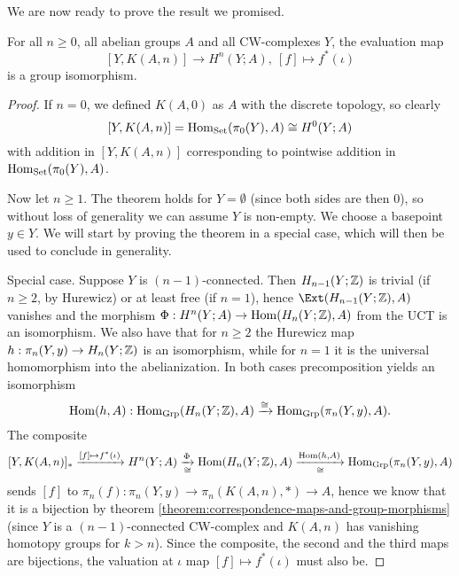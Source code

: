 We are now ready to prove the result we promised.

\begin{theorem}
For all $n\ge0$, all abelian groups $A$ and all CW-complexes $Y$, the evaluation map
\[
    [Y,K(A,n)]\to H^n(Y;A),\ [f]\mapsto f^*(\iota)
\]
is a group isomorphism.
\end{theorem}

\begin{proof}\renewcommand{\qedsymbol}{\textit{To be continued...}}
If $n=0$, we defined $K(A,0)$ as $A$ with the discrete topology, so clearly
\[[Y,K(A,n)]=\operatorname{Hom}_{\mathrm{Set}}(\pi_0(Y),A)\cong H^0(Y;A)\]
with addition in $[Y,K(A,n)]$ corresponding to pointwise addition in $\operatorname{Hom}_{\mathrm{Set}}(\pi_0(Y),A)$.

Now let $n\ge1$. The theorem holds for $Y=\emptyset$ (since both sides are then $0$), so without loss of generality we can assume $Y$ is non-empty. We choose a basepoint $y\in Y$. We will start by proving the theorem in a special case, which will then be used to conclude in generality.

Special case. Suppose $Y$ is $(n-1)$-connected. Then $H_{n-1}(Y;{\mathbb Z})$ is trivial (if $n\ge2$, by Hurewicz) or at least free (if $n=1$), hence $\Ext(H_\ni(Y;\Z),A)$ vanishes and the morphism $\Phi:H^n(Y;A)\to\operatorname{Hom}(H_n(Y;{\mathbb Z}),A)$ from the UCT is an isomorphism. We also have that for $n\ge2$ the Hurewicz map $h:\pi_n(Y,y)\to H_n(Y;{\mathbb Z})$ is an isomorphism, while for $n=1$ it is the universal homomorphism into the abelianization. In both cases precomposition yields an isomorphism
\[\operatorname{Hom}(h,A):\operatorname{Hom}_{\mathrm{Grp}}(H_n(Y;{\mathbb Z}),A)\xrightarrow{\cong}\operatorname{Hom}_{\mathrm{Grp}}(\pi_n(Y,y),A).\]
The composite
\[[Y,K(A,n)]_*\xrightarrow{[f]\mapsto f^*(\iota)} H^n(Y;A)\underset{\cong}{\xrightarrow{\Phi}}\operatorname{Hom}(H_n(Y;{\mathbb Z}),A)\underset{\cong}{\xrightarrow{\operatorname{Hom}(h,A)}}\operatorname{Hom}_{\mathrm{Grp}}(\pi_n(Y,y),A)\]
sends $[f]$ to $\pi_n(f):\pi_n(Y,y)\to\pi_n(K(A,n),*)\to A$, hence we know that it is a bijection by theorem \ref{theorem:correspondence-maps-and-group-morphisms} (since $Y$ is a $(n-1)$-connected CW-complex and $K(A,n)$ has vanishing homotopy groups for $k>n$). Since the composite, the second and the third maps are bijections, the valuation at $\iota$ map $[f]\mapsto f^*(\iota)$ must also be.
\end{proof}
